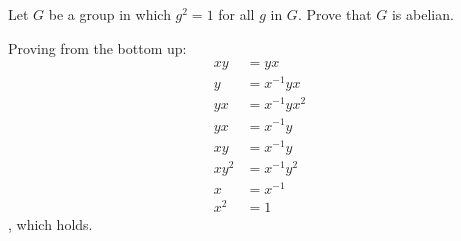 \begin{exercise}
    Let \(G\) be a group in which \(g^2 = 1\) for all \(g\) in \(G\). Prove that \(G\) is abelian.
\end{exercise}
\begin{solution}
    Proving from the bottom up:
    \begin{align*}
        xy   & = yx            \\
        y    & = x^{ - 1} yx   \\
        yx   & = x^{ - 1} yx^2 \\
        yx   & = x^{ - 1} y    \\
        xy   & = x^{ - 1} y    \\
        xy^2 & = x^{ - 1} y^2  \\
        x    & = x^{ - 1}      \\
        x^2  & = 1
    \end{align*}
    , which holds.
\end{solution}


